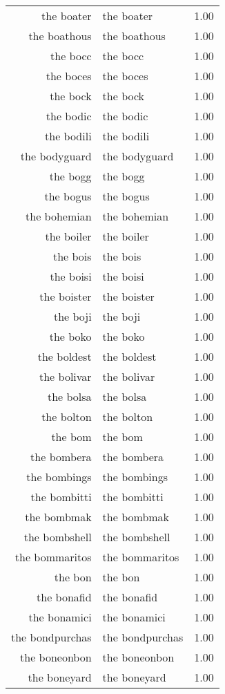\begin{table}[ht]
\begin{tabular}{rlr}
  the boater & the boater & 1.00 \\ 
  the boathous & the boathous & 1.00 \\ 
  the bocc & the bocc & 1.00 \\ 
  the boces & the boces & 1.00 \\ 
  the bock & the bock & 1.00 \\ 
  the bodic & the bodic & 1.00 \\ 
  the bodili & the bodili & 1.00 \\ 
  the bodyguard & the bodyguard & 1.00 \\ 
  the bogg & the bogg & 1.00 \\ 
  the bogus & the bogus & 1.00 \\ 
  the bohemian & the bohemian & 1.00 \\ 
  the boiler & the boiler & 1.00 \\ 
  the bois & the bois & 1.00 \\ 
  the boisi & the boisi & 1.00 \\ 
  the boister & the boister & 1.00 \\ 
  the boji & the boji & 1.00 \\ 
  the boko & the boko & 1.00 \\ 
  the boldest & the boldest & 1.00 \\ 
  the bolivar & the bolivar & 1.00 \\ 
  the bolsa & the bolsa & 1.00 \\ 
  the bolton & the bolton & 1.00 \\ 
  the bom & the bom & 1.00 \\ 
  the bombera & the bombera & 1.00 \\ 
  the bombings & the bombings & 1.00 \\ 
  the bombitti & the bombitti & 1.00 \\ 
  the bombmak & the bombmak & 1.00 \\ 
  the bombshell & the bombshell & 1.00 \\ 
  the bommaritos & the bommaritos & 1.00 \\ 
  the bon & the bon & 1.00 \\ 
  the bonafid & the bonafid & 1.00 \\ 
  the bonamici & the bonamici & 1.00 \\ 
  the bondpurchas & the bondpurchas & 1.00 \\ 
  the boneonbon & the boneonbon & 1.00 \\ 
  the boneyard & the boneyard & 1.00 \\ 

\end{tabular}
\end{table}
